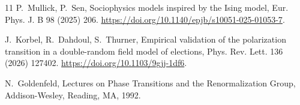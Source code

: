 \documentclass[preprint,12pt]{elsarticle}
\begin{document}
\begin{thebibliography}{11}
P.~Mullick, P.~Sen,
Sociophysics models inspired by the Ising model,
Eur. Phys. J. B 98 (2025) 206. \href{https://doi.org/10.1140/epjb/s10051-025-01053-7}{https://doi.org/10.1140/epjb/s10051-025-01053-7}.

J.~Korbel, R.~Dahdoul, S.~Thurner,
Empirical validation of the polarization transition in a double-random field model of
elections,
Phys. Rev. Lett. 136 (2026) 127402. \href{https://doi.org/10.1103/9gjj-1df6}{https://doi.org/10.1103/9gjj-1df6}.

N.~Goldenfeld,
Lectures on Phase Transitions and the Renormalization Group,
Addison-Wesley, Reading, MA, 1992.

\end{thebibliography}
\end{document}
